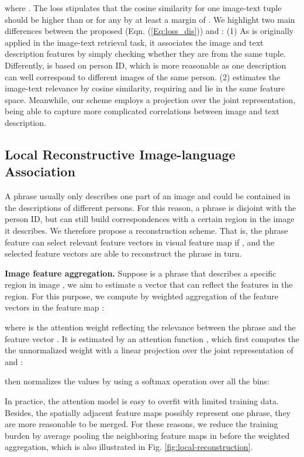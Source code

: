 \documentclass[runningheads]{llncs}
\begin{document}
where . The loss stipulates that the cosine similarity   for one image-text tuple should be higher than  or  for any  by at least a margin of .  We highlight two main differences between the proposed (Eqn. (\ref{Eq:loss_dis})) and : (1) As  is originally applied in the image-text retrieval task,  it associates the image and text description features by simply checking whether they are from the same tuple. Differently,  is based on person ID, which is more reasonable as one description can well correspond to different images of the same person. (2)  estimates the image-text relevance by cosine similarity, requiring  and  lie in the same feature space. Meanwhile, our scheme employs a projection over the joint representation, being able to capture more complicated correlations between image and text description.
 
 

\subsection{Local Reconstructive Image-language Association}\label{Sec:LRA}


A phrase usually only describes one part of an image and could be contained in the descriptions of different persons. For this reason, a phrase is disjoint with the person ID, but can still build correspondences with a certain region in the image it describes. We therefore propose a reconstruction scheme.  That is, the phrase feature  can select relevant feature vectors in visual feature map  if , and the selected feature vectors are able to reconstruct the phrase  in turn.

\vspace{0.5em}

\noindent \textbf{Image feature aggregation.} Suppose  is a phrase that describes a specific region in image , we aim to estimate a vector  that can reflect the features in the region. For this purpose, we compute  by weighted aggregation of the feature vectors  in the feature map : 

where  is the attention weight reflecting the relevance between the phrase  and the feature vector  . It is estimated by an attention function , which first computes the the unnormalized weight  with a linear projection over the joint representation of  and  :

then normalizes the values by using a softmax operation over all the  bins:

In practice, the attention model is easy to overfit with limited training data.  Besides, the spatially adjacent feature maps possibly represent one phrase, they are more reasonable to be merged. For these reasons, we reduce the training burden by average pooling the neighboring feature maps in  before the weighted aggregation, which is also illustrated in Fig. \ref{fig:local-reconstruction}.  
\end{document}
